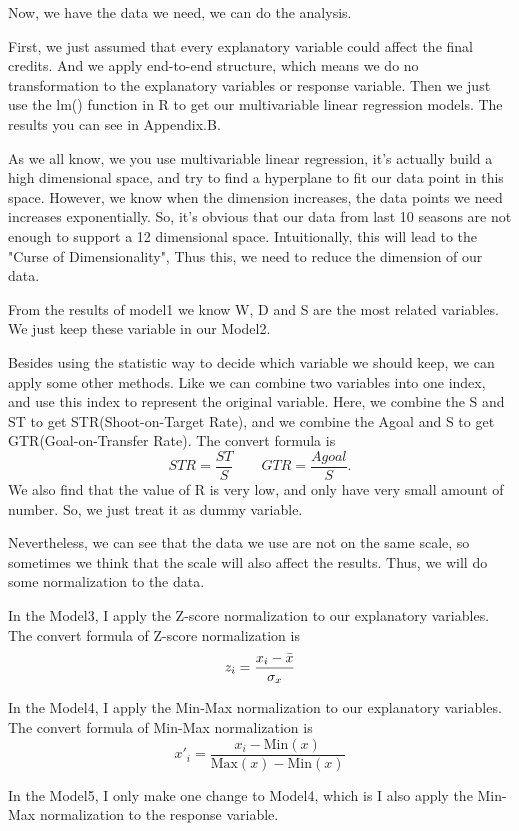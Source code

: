 \documentclass[12pt]{article}
\begin{document}
Now, we have the data we need, we can do the analysis. 

First, we just assumed that every explanatory variable could affect the final credits. And we apply end-to-end structure, which means we do no transformation to the explanatory variables or response variable. Then we just use the lm() function in R to get our multivariable linear regression models. The results you can see in Appendix.B. 

As we all know, we you use multivariable linear regression, it's actually build a high dimensional space, and try to find a hyperplane to fit our data point in this space. However, we know when the dimension increases, the data points we need increases exponentially. So, it's obvious that our data from last 10 seasons are not enough to support a 12 dimensional space. Intuitionally, this will lead to the "Curse of Dimensionality", Thus this, we need to reduce the dimension of our data. 

From the results of model1 we know W, D and S are the most related variables. We just keep these variable in our Model2.

Besides using the statistic way to decide which variable we should keep, we can apply some other methods. Like we can combine two variables into one index, and use this index to represent the original variable. Here, we combine the S and ST to get STR(Shoot-on-Target Rate), and we combine the Agoal and S to get GTR(Goal-on-Transfer Rate). The convert formula is 
$$
STR = \frac{ST}{S} \quad \quad GTR = \frac{Agoal}{S}.
$$
We also find that the value of R is very low, and only have very small amount of number. So, we just treat it as dummy variable. 

Nevertheless, we can see that the data we use are not on the same scale, so sometimes we think that the scale will also affect the results. Thus, we will do some normalization to the data.

In the Model3, I apply the Z-score normalization to our explanatory variables. The convert formula of Z-score normalization is 
$$
z_i = \frac{x_i - \Bar{x}}{\sigma_x}
$$

In the Model4, I apply the Min-Max normalization to our explanatory variables. The convert formula of Min-Max normalization is 
$$
x'_i = \frac{x_i - \text{Min}(x)}{\text{Max}(x)-\text{Min}(x)}
$$

In the Model5, I only make one change to Model4, which is I also apply the Min-Max normalization to the response variable.  
\end{document}
